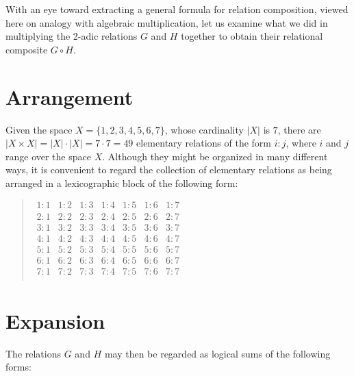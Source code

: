 \documentclass[12pt]{article}
\begin{document}
With an eye toward extracting a general formula for relation composition, viewed here on analogy with algebraic multiplication, let us examine what we did in multiplying the 2-adic relations $G$ and $H$ together to obtain their relational composite $G \circ H$.

\section{Arrangement}

Given the space $X = \{ 1, 2, 3, 4, 5, 6, 7 \}$, whose cardinality $|X|$ is $7$, there are $|X \times X| = |X| \cdot |X| = 7 \cdot 7 = 49$ elementary relations of the form $i:j$, where $i$ and $j$ range over the space $X$.  Although they might be organized in many different ways, it is convenient to regard the collection of elementary relations as being arranged in a lexicographic block of the following form:

\begin{quote}$\begin{array}{lllllll}
1\mathrm{:}1 & 1\mathrm{:}2 & 1\mathrm{:}3 & 1\mathrm{:}4 & 1\mathrm{:}5 & 1\mathrm{:}6 & 1\mathrm{:}7 \\
2\mathrm{:}1 & 2\mathrm{:}2 & 2\mathrm{:}3 & 2\mathrm{:}4 & 2\mathrm{:}5 & 2\mathrm{:}6 & 2\mathrm{:}7 \\
3\mathrm{:}1 & 3\mathrm{:}2 & 3\mathrm{:}3 & 3\mathrm{:}4 & 3\mathrm{:}5 & 3\mathrm{:}6 & 3\mathrm{:}7 \\
4\mathrm{:}1 & 4\mathrm{:}2 & 4\mathrm{:}3 & 4\mathrm{:}4 & 4\mathrm{:}5 & 4\mathrm{:}6 & 4\mathrm{:}7 \\
5\mathrm{:}1 & 5\mathrm{:}2 & 5\mathrm{:}3 & 5\mathrm{:}4 & 5\mathrm{:}5 & 5\mathrm{:}6 & 5\mathrm{:}7 \\
6\mathrm{:}1 & 6\mathrm{:}2 & 6\mathrm{:}3 & 6\mathrm{:}4 & 6\mathrm{:}5 & 6\mathrm{:}6 & 6\mathrm{:}7 \\
7\mathrm{:}1 & 7\mathrm{:}2 & 7\mathrm{:}3 & 7\mathrm{:}4 & 7\mathrm{:}5 & 7\mathrm{:}6 & 7\mathrm{:}7 \\
\end{array}$\end{quote}

\section{Expansion}

The relations $G$ and $H$ may then be regarded as logical sums of the following forms:
\end{document}
